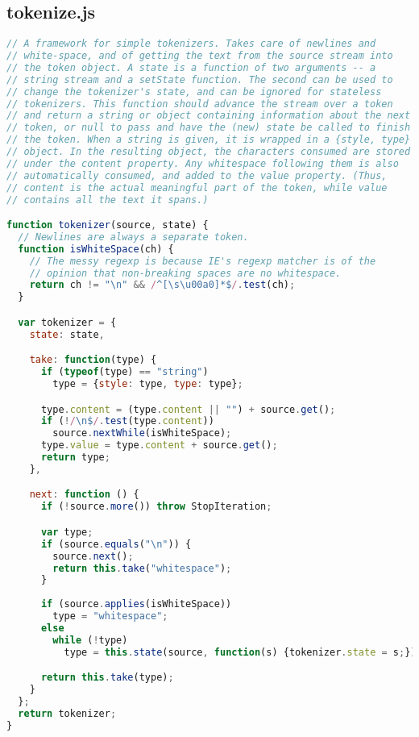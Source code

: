 \subsection{tokenize.js}
\begin{lstlisting}[language=Javascript]
// A framework for simple tokenizers. Takes care of newlines and
// white-space, and of getting the text from the source stream into
// the token object. A state is a function of two arguments -- a
// string stream and a setState function. The second can be used to
// change the tokenizer's state, and can be ignored for stateless
// tokenizers. This function should advance the stream over a token
// and return a string or object containing information about the next
// token, or null to pass and have the (new) state be called to finish
// the token. When a string is given, it is wrapped in a {style, type}
// object. In the resulting object, the characters consumed are stored
// under the content property. Any whitespace following them is also
// automatically consumed, and added to the value property. (Thus,
// content is the actual meaningful part of the token, while value
// contains all the text it spans.)

function tokenizer(source, state) {
  // Newlines are always a separate token.
  function isWhiteSpace(ch) {
    // The messy regexp is because IE's regexp matcher is of the
    // opinion that non-breaking spaces are no whitespace.
    return ch != "\n" && /^[\s\u00a0]*$/.test(ch);
  }

  var tokenizer = {
    state: state,

    take: function(type) {
      if (typeof(type) == "string")
        type = {style: type, type: type};

      type.content = (type.content || "") + source.get();
      if (!/\n$/.test(type.content))
        source.nextWhile(isWhiteSpace);
      type.value = type.content + source.get();
      return type;
    },

    next: function () {
      if (!source.more()) throw StopIteration;

      var type;
      if (source.equals("\n")) {
        source.next();
        return this.take("whitespace");
      }
      
      if (source.applies(isWhiteSpace))
        type = "whitespace";
      else
        while (!type)
          type = this.state(source, function(s) {tokenizer.state = s;});

      return this.take(type);
    }
  };
  return tokenizer;
}
\end{lstlisting}

